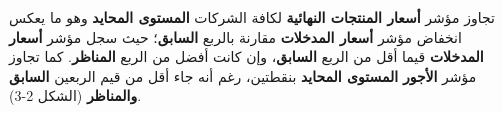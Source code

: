 تجاوز مؤشر \textbf{أسعار المنتجات النهائية} لكافة الشركات \textbf{المستوى المحايد} وهو ما يعكس انخفاض مؤشر \textbf{أسعار المدخلات} مقارنة بالربع \textbf{السابق}؛ حيث سجل مؤشر \textbf{أسعار المدخلات} قيما أقل من الربع \textbf{السابق}، وإن كانت أفضل من الربع \textbf{المناظر}. كما تجاوز مؤشر \textbf{الأجور} \textbf{المستوى المحايد} بنقطتين، رغم أنه جاء أقل من قيم الربعين \textbf{السابق والمناظر} (الشكل 2-3).
